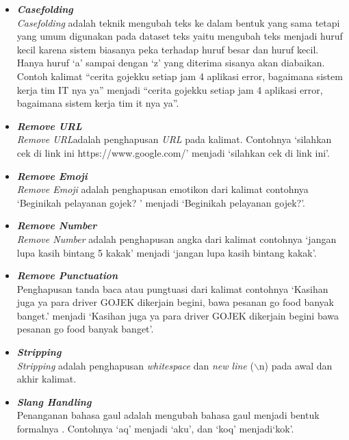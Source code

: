 \begin{itemize}

      \item \emph{\bfseries Casefolding}\\
      \emph{Casefolding} adalah teknik mengubah teks ke dalam bentuk yang sama tetapi
      yang umum digunakan pada dataset teks yaitu mengubah teks menjadi huruf kecil karena sistem
      biasanya peka terhadap huruf besar dan huruf kecil. Hanya huruf `a' sampai dengan `z' yang
      diterima sisanya akan diabaikan. Contoh kalimat “cerita gojekku setiap jam 4 aplikasi error,
      bagaimana sistem kerja tim IT nya ya” menjadi “cerita gojekku setiap jam 4 aplikasi error,
      bagaimana sistem kerja tim it nya ya”.

      \item \emph{\bfseries \emph{Remove URL}}\\
      \emph{Remove URL}adalah penghapusan \emph{URL} pada kalimat. Contohnya
      `silahkan cek di link ini https://www.google.com/' menjadi `silahkan cek di link ini'.

      \item \emph{\bfseries \emph{Remove Emoji}}\\
      \emph{Remove Emoji} adalah penghapusan emotikon dari kalimat contohnya `Beginikah pelayanan
      gojek? ' menjadi `Beginikah pelayanan gojek?'.

      \item {\bfseries \emph{Remove Number}}\\
      \emph{Remove Number} adalah penghapusan angka dari kalimat contohnya `jangan lupa kasih bintang 5 kakak'
      menjadi `jangan lupa kasih bintang kakak'.

      \item {\bfseries \emph{Remove Punctuation}}\\
      Penghapusan tanda baca atau pungtuasi dari kalimat contohnya `Kasihan juga ya para driver GOJEK
      dikerjain begini, bawa pesanan go food banyak banget.' menjadi `Kasihan juga ya para driver
      GOJEK dikerjain begini bawa pesanan go food banyak banget'.
      
      \item \emph{\bfseries \emph{Stripping}}\\
      \emph{Stripping} adalah penghapusan \emph{whitespace} dan \emph{new line} ($\backslash$n)
      pada awal dan akhir kalimat.

      \item {\bfseries \emph{Slang Handling}}\\
      Penanganan bahasa gaul adalah mengubah bahasa gaul menjadi bentuk formalnya
      \citep{Resyanto2019}. Contohnya `aq' menjadi `aku', dan `koq' menjadi`kok'.
            

\end{itemize}
